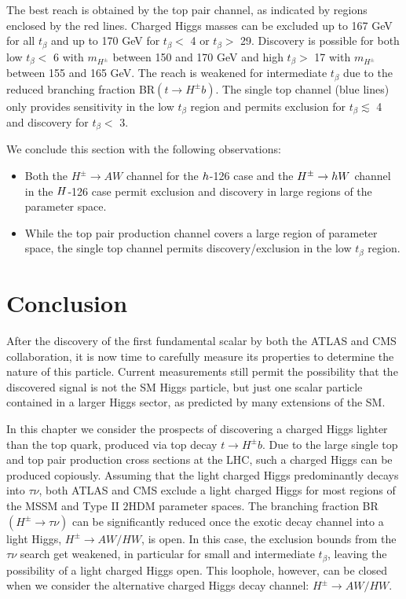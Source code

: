 The best reach is obtained by the top pair channel, as indicated by regions enclosed by the red lines. Charged Higgs masses can be excluded up to 167 GeV for all $t_{\beta}$ and up to 170 GeV for $t_{\beta}<$ 4 or $t_{\beta}>$ 29. Discovery is possible for both low $t_{\beta}<$ 6 with $m_{H^\pm}$ between 150 and 170 GeV and high $t_{\beta} >$ 17 with $m_{H^\pm}$ between 155 and 165 GeV. The reach is weakened for intermediate $t_{\beta}$ due to the reduced branching fraction BR$(t \rightarrow H^{\pm} b)$. The single top channel (blue lines) only provides sensitivity in the low $t_{\beta}$ region and permits exclusion for $t_{\beta} \lesssim$ 4 and discovery for $t_\beta < $ 3. 


 We conclude this section with the following observations: 
\begin{itemize}
\item Both the $H^{\pm} \rightarrow A W$ channel for the $h$-126 case and the $H^{\pm} \rightarrow h W$ channel in the $H$-126 case permit exclusion and discovery in large regions of the parameter space.

\item While the top pair production channel covers a large region of parameter space, the single top channel permits discovery/exclusion in the low $t_{\beta}$ region.  
\end{itemize} 

\section{Conclusion}
\label{sec:light_charged_conclusion}
After the discovery of the first fundamental scalar by both the ATLAS and CMS collaboration, it is now time to carefully measure its properties to determine the nature of this particle. Current measurements still permit the possibility that the discovered signal is not the SM Higgs particle, but just one scalar particle contained in a larger Higgs sector, as predicted by many extensions of the SM.

In this chapter we consider the prospects of discovering a charged Higgs lighter than the top quark, produced via top decay $t \rightarrow H^{\pm} b$. Due to the large single top and top pair production cross sections at the LHC, such a charged Higgs can be produced copiously. Assuming that the light charged Higgs predominantly decays into $\tau\nu$, both ATLAS and CMS exclude a light charged Higgs for most regions of the MSSM and Type II $2$HDM parameter spaces. The branching fraction BR$(H^{\pm} \rightarrow \tau\nu)$ can be significantly reduced once the exotic decay channel into a light Higgs, $H^{\pm} \rightarrow AW/HW$, is open. In this case, the exclusion bounds from the $\tau\nu$ search get weakened, in particular for small and intermediate $t_{\beta}$, leaving the possibility of a light charged Higgs open. This loophole, however, can be closed when we consider the alternative charged Higgs decay channel: $H^\pm \to AW/HW$.

